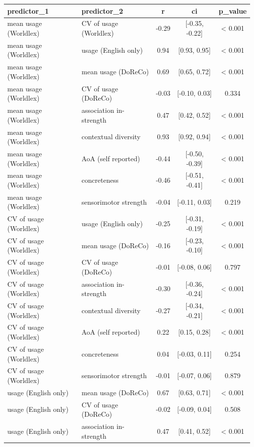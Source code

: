 \begin{tabular}{llccc}
  \hline
predictor_1 & predictor_2 & r & ci & p_value \\ 
  \hline
mean usage (Worldlex) & CV of usage (Worldlex) & -0.29 & [-0.35, -0.22] & < 0.001 \\ 
  mean usage (Worldlex) & usage (English only) & 0.94 & [0.93, 0.95] & < 0.001 \\ 
  mean usage (Worldlex) & mean usage (DoReCo) & 0.69 & [0.65, 0.72] & < 0.001 \\ 
  mean usage (Worldlex) & CV of usage (DoReCo) & -0.03 & [-0.10, 0.03] & 0.334 \\ 
  mean usage (Worldlex) & association in-strength & 0.47 & [0.42, 0.52] & < 0.001 \\ 
  mean usage (Worldlex) & contextual diversity & 0.93 & [0.92, 0.94] & < 0.001 \\ 
  mean usage (Worldlex) & AoA (self reported) & -0.44 & [-0.50, -0.39] & < 0.001 \\ 
  mean usage (Worldlex) & concreteness & -0.46 & [-0.51, -0.41] & < 0.001 \\ 
  mean usage (Worldlex) & sensorimotor strength & -0.04 & [-0.11, 0.03] & 0.219 \\ 
  CV of usage (Worldlex) & usage (English only) & -0.25 & [-0.31, -0.19] & < 0.001 \\ 
  CV of usage (Worldlex) & mean usage (DoReCo) & -0.16 & [-0.23, -0.10] & < 0.001 \\ 
  CV of usage (Worldlex) & CV of usage (DoReCo) & -0.01 & [-0.08, 0.06] & 0.797 \\ 
  CV of usage (Worldlex) & association in-strength & -0.30 & [-0.36, -0.24] & < 0.001 \\ 
  CV of usage (Worldlex) & contextual diversity & -0.27 & [-0.34, -0.21] & < 0.001 \\ 
  CV of usage (Worldlex) & AoA (self reported) & 0.22 & [0.15, 0.28] & < 0.001 \\ 
  CV of usage (Worldlex) & concreteness & 0.04 & [-0.03, 0.11] & 0.254 \\ 
  CV of usage (Worldlex) & sensorimotor strength & -0.01 & [-0.07, 0.06] & 0.879 \\ 
  usage (English only) & mean usage (DoReCo) & 0.67 & [0.63, 0.71] & < 0.001 \\ 
  usage (English only) & CV of usage (DoReCo) & -0.02 & [-0.09, 0.04] & 0.508 \\ 
  usage (English only) & association in-strength & 0.47 & [0.41, 0.52] & < 0.001 \\ 

\end{tabular}
